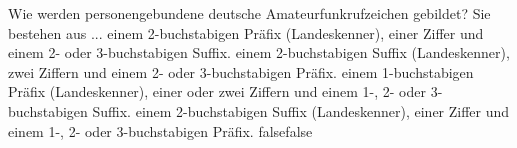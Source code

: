     {Wie werden personengebundene deutsche Amateurfunkrufzeichen gebildet? Sie bestehen aus ...}
    {einem 2-buchstabigen Präfix (Landeskenner), einer Ziffer und einem 2- oder 3-buchstabigen Suffix.}
    {einem 2-buchstabigen Suffix (Landeskenner), zwei Ziffern und einem 2- oder 3-buchstabigen Präfix.}
    {einem 1-buchstabigen Präfix (Landeskenner), einer oder zwei Ziffern und einem 1-, 2- oder 3-buchstabigen Suffix.}
    {einem 2-buchstabigen Suffix (Landeskenner), einer Ziffer und einem 1-, 2- oder 3-buchstabigen Präfix.}
    {false}{false}